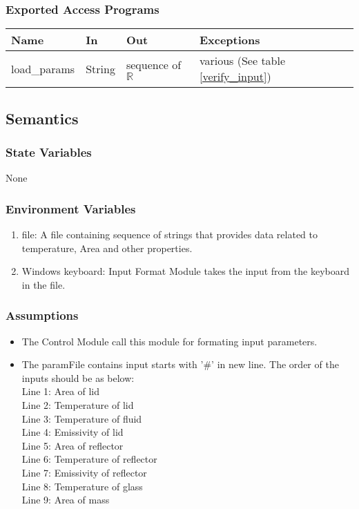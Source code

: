 \documentclass[12pt, titlepage]{article}
\begin{document}
\subsubsection{Exported Access Programs}

\begin{center}
\begin{tabular}{p{2.5cm} p{3.5cm} p{4cm} p{4cm}}
\hline
\textbf{Name} & \textbf{In} & \textbf{Out} & \textbf{Exceptions} \\
\hline
load\_params & String & sequence of $\mathbb{R}$ & various (See table \ref{verify_input}) \\
\hline
\end{tabular}
\end{center}

\subsection{Semantics}

\subsubsection{State Variables}

None

\subsubsection{Environment Variables}

\begin{enumerate}
    \item file: A file containing sequence of strings that provides data related to temperature, Area and other properties.
        \item Windows keyboard: Input Format Module takes the input from the keyboard in the file. 
\end{enumerate}


\subsubsection{Assumptions}

\begin{itemize}
    \item The Control Module call this module for formating input parameters. 
    \item The paramFile contains input starts with '\#' in new line. The order of the inputs should be as below: \\ 
    Line 1: Area of lid \\
    Line 2: Temperature of lid \\
    Line 3: Temperature of fluid \\
    Line 4: Emissivity of lid \\
    Line 5: Area of reflector \\ 
    Line 6: Temperature of reflector \\ 
    Line 7: Emissivity of reflector \\ 
    Line 8: Temperature of glass \\
    Line 9: Area of mass 
\end{itemize}
\end{document}
